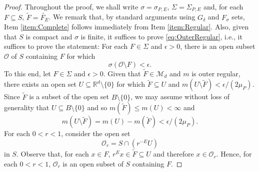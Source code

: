 \documentclass[11pt]{article}
\theoremstyle{remark}
\begin{document}
\begin{proof}
Throughout the proof, we shall write $\sigma=\sigma_{P,E}$, $\Sigma=\Sigma_{P,E}$ and, for each $F\subseteq S$, $\widetilde{F}=\widetilde{F_E}$. We remark that, by standard arguments using $G_\delta$ and $F_\sigma$ sets, Item \ref{item:Complete} follows immediately from Item \ref{item:Regular}. Also, given that $S$ is compact and $\sigma$ is finite, it suffices to prove \eqref{eq:OuterRegular}, i.e., it suffices to prove the statement: For each $F\in \Sigma$ and $\epsilon>0$, there is an open subset $\mathcal{O}$ of $S$ containing $F$ for which 
\begin{equation*}
\sigma(\mathcal{O}\setminus F)<\epsilon.
\end{equation*}
To this end, let $F\in \Sigma$ and $\epsilon>0$. Given that $\widetilde{F}\in\mathcal{M}_d$ and $m$ is outer regular, there exists an open set $U\subseteq \mathbb{R}^d\setminus\{0\}$ for which $\widetilde{F}\subseteq U$ and $m(U\setminus\widetilde{F})<\epsilon/(2\mu_P)$. Since $\widetilde{F}$ is a subset of the open set $B\setminus\{0\}$, we may assume without loss of generality that $U\subseteq B\setminus\{0\}$ and so $m(\widetilde{F})\leq m(U)<\infty$ and
\begin{equation}\label{eq:LebesgueOuter}
m(U\setminus \widetilde{F})=m(U)-m(\widetilde{F})<\epsilon/(2\mu_P).
\end{equation}
For each $0<r<1$, consider the open set
\begin{equation*}
\mathcal{O}_r=S\cap\left( r^{-E}U\right)
\end{equation*}
in $S$. Observe that, for each $x\in F$, $r^E x\in \widetilde{F}\subseteq U$ and therefore $x\in \mathcal{O}_r$. Hence, for each $0<r<1$, $\mathcal{O}_r$ is an open subset of $S$ containing $F$. 


\end{proof}
\end{document}
